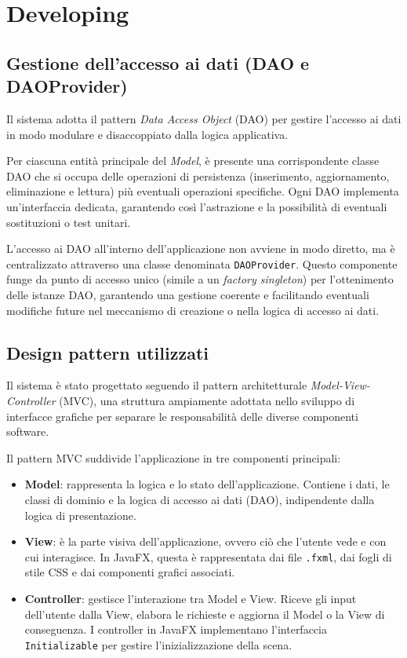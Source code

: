 \documentclass[a4paper]{article}
\begin{document}
\section{Developing}
\subsection{Gestione dell’accesso ai dati (DAO e DAOProvider)}
Il sistema adotta il pattern \textit{Data Access Object} (DAO) per gestire l’accesso ai dati in modo modulare e disaccoppiato dalla logica applicativa.

Per ciascuna entità principale del \textit{Model}, è presente una corrispondente classe DAO che si occupa delle operazioni di persistenza (inserimento, aggiornamento, eliminazione e lettura) più eventuali operazioni specifiche. Ogni DAO implementa un’interfaccia dedicata, garantendo così l’astrazione e la possibilità di eventuali sostituzioni o test unitari.

L’accesso ai DAO all’interno dell’applicazione non avviene in modo diretto, ma è centralizzato attraverso una classe denominata \texttt{DAOProvider}. Questo componente funge da punto di accesso unico (simile a un \textit{factory singleton}) per l’ottenimento delle istanze DAO, garantendo una gestione coerente e facilitando eventuali modifiche future nel meccanismo di creazione o nella logica di accesso ai dati.


\subsection{Design pattern utilizzati}

Il sistema è stato progettato seguendo il pattern architetturale \textit{Model-View-Controller} (MVC), una struttura ampiamente adottata nello sviluppo di interfacce grafiche per separare le responsabilità delle diverse componenti software.

Il pattern MVC suddivide l'applicazione in tre componenti principali:

\begin{itemize}
    \item \textbf{Model}: rappresenta la logica e lo stato dell’applicazione. Contiene i dati, le classi di dominio e la logica di accesso ai dati (DAO), indipendente dalla logica di presentazione.

    \item \textbf{View}: è la parte visiva dell’applicazione, ovvero ciò che l’utente vede e con cui interagisce. In JavaFX, questa è rappresentata dai file \texttt{.fxml}, dai fogli di stile CSS e dai componenti grafici associati.

    \item \textbf{Controller}: gestisce l’interazione tra Model e View. Riceve gli input dell’utente dalla View, elabora le richieste e aggiorna il Model o la View di conseguenza. I controller in JavaFX implementano l’interfaccia \texttt{Initializable} per gestire l’inizializzazione della scena.
\end{itemize}
\end{document}
